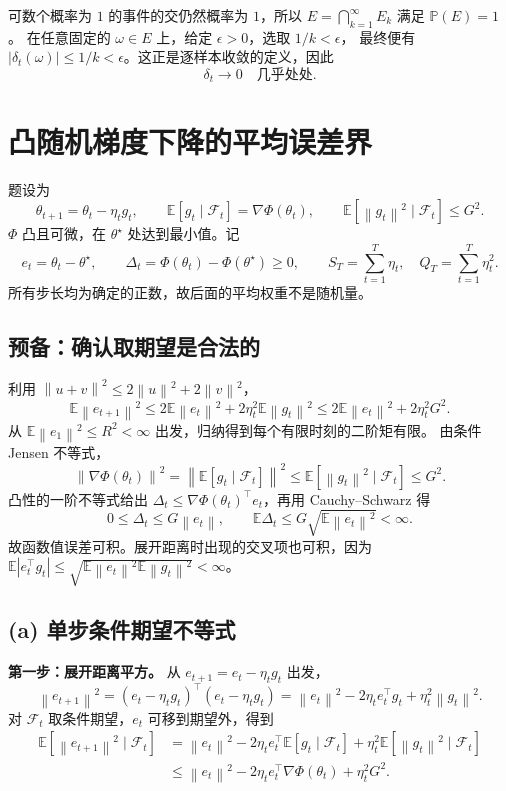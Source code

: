 \documentclass[UTF8,a4paper,11pt,fontset=fandol]{ctexart}
\newcommand{\E}{\mathbb E}
\newcommand{\Pp}{\mathbb P}
\newcommand{\norm}[1]{\left\lVert#1\right\rVert}
\begin{document}
可数个概率为 $1$ 的事件的交仍然概率为 $1$，所以
$E=\bigcap_{k=1}^\infty E_k$ 满足 $\Pp(E)=1$。
在任意固定的 $\omega\in E$ 上，给定 $\epsilon>0$，选取 $1/k<\epsilon$，
最终便有 $|\delta_t(\omega)|\leq1/k<\epsilon$。这正是逐样本收敛的定义，因此
\[
 \boxed{\delta_t\longrightarrow0\quad\text{几乎处处}.}
\]

\section{凸随机梯度下降的平均误差界}
题设为
\[
 \theta_{t+1}=\theta_t-\eta_tg_t,\qquad
 \E[g_t\mid\mathcal F_t]=\nabla\Phi(\theta_t),\qquad
 \E[\norm{g_t}^2\mid\mathcal F_t]\leq G^2.
\]
$\Phi$ 凸且可微，在 $\theta^\star$ 处达到最小值。记
\[
 e_t=\theta_t-\theta^\star,\qquad
 \Delta_t=\Phi(\theta_t)-\Phi(\theta^\star)\geq0,
 \qquad S_T=\sum_{t=1}^T\eta_t,\quad Q_T=\sum_{t=1}^T\eta_t^2.
\]
所有步长均为确定的正数，故后面的平均权重不是随机量。

\subsection*{预备：确认取期望是合法的}
利用 $\norm{u+v}^2\leq2\norm u^2+2\norm v^2$，
\[
 \E\norm{e_{t+1}}^2
 \leq2\E\norm{e_t}^2+2\eta_t^2\E\norm{g_t}^2
 \leq2\E\norm{e_t}^2+2\eta_t^2G^2.
\]
从 $\E\norm{e_1}^2\leq R^2<\infty$ 出发，归纳得到每个有限时刻的二阶矩有限。
由条件 Jensen 不等式，
\[
 \norm{\nabla\Phi(\theta_t)}^2
 =\norm{\E[g_t\mid\mathcal F_t]}^2
 \leq\E[\norm{g_t}^2\mid\mathcal F_t]\leq G^2.
\]
凸性的一阶不等式给出
$\Delta_t\leq\nabla\Phi(\theta_t)^\top e_t$，再用 Cauchy--Schwarz 得
\[
 0\leq\Delta_t\leq G\norm{e_t},\qquad
 \E\Delta_t\leq G\sqrt{\E\norm{e_t}^2}<\infty.
\]
故函数值误差可积。展开距离时出现的交叉项也可积，因为
$\E|e_t^\top g_t|\leq\sqrt{\E\norm{e_t}^2\E\norm{g_t}^2}<\infty$。

\subsection*{(a) 单步条件期望不等式}
\textbf{第一步：展开距离平方。}
从 $e_{t+1}=e_t-\eta_tg_t$ 出发，
\[
 \norm{e_{t+1}}^2
 =(e_t-\eta_tg_t)^\top(e_t-\eta_tg_t)
 =\norm{e_t}^2-2\eta_te_t^\top g_t+\eta_t^2\norm{g_t}^2.
\]
对 $\mathcal F_t$ 取条件期望，$e_t$ 可移到期望外，得到
\begin{align*}
 \E[\norm{e_{t+1}}^2\mid\mathcal F_t]
 &=\norm{e_t}^2-2\eta_te_t^\top\E[g_t\mid\mathcal F_t]
   +\eta_t^2\E[\norm{g_t}^2\mid\mathcal F_t]\\
 &\leq\norm{e_t}^2-2\eta_te_t^\top\nabla\Phi(\theta_t)+\eta_t^2G^2.
\end{align*}
\end{document}
